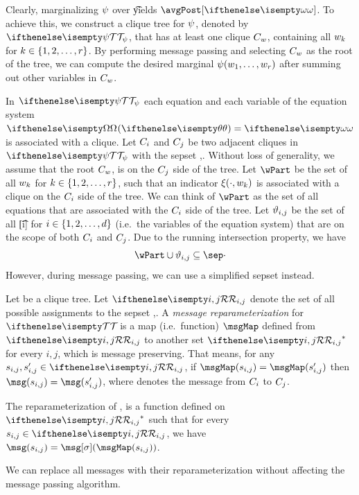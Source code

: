 Clearly, marginalizing $\psi$ over \t yields $\avgPost[\w]$.
To achieve this, we construct a clique tree for $\psi$, denoted by $\ct{\M}$, that has at least one clique $C_{w}$,
containing all
$w_k$ for $k \in \left\{ 1, 2, \ldots, r \right\}$.
By performing message passing and selecting $C_{w}$ as the root of the tree, we can compute the desired
marginal $\psi(w_1, \ldots, w_{r})$ after summing out other variables in $C_{w}$.

In $\ct{\M}$ each equation and each variable of the equation system $\eqSys$ is associated with a clique.
Let $C_{i}$ and $C_{j}$ be two adjacent cliques in $\ct{\M}$ with the sepset \sep.
Without loss of generality, we assume that the root $C_{w}$, is on the $C_{j}$ side of the tree.
Let $\wPart$ be the set of all $w_k$ for $k \in \left\{ 1, 2, \ldots, r \right\}$,
such that an indicator $\xi(\cdot, w_k)$ is associated with a clique on the $C_{i}$ side of the tree.
We can think of $\wPart$ as the set of all equations that are associated with the $C_{i}$ side of the tree.
Let $\vartheta_{i,j}$ be the set of all \t[i] for $i \in \left\{ 1, 2, \ldots, d \right\}$ (i.e.\ the variables of the equation system)
that are on the scope of both $C_{i}$ and $C_{j}$.
Due to the running intersection property, we have
\[
    \wPart \cup \eqScopeSep{i}{j} \subseteq \sep \cdot
\]
However, during message passing, we can use a simplified sepset instead.

\begin{definition}
    Let \ct{} be a clique tree.
    Let $\rangeSep$ denote the set of all possible assignments to the sepset \sep.
    A \emph{message reparameterization} for $\ct{}$ is a map (i.e.\ function) $\msgMap$ defined from $\rangeSep$
    to another set $\altRangeSep$ for every $i, j$, which is message preserving.
    That means, for any $\sepVal, \sepVal' \in \rangeSep$, if $\msgMap(\sepVal) = \msgMap(\sepVal')$
    then $\msg(\sepVal) = \msg(\sepVal')$, where \msg denotes the message from $C_{i}$ to $C_{j}$.

    The reparameterization of \msg, is a function \msg[\altMsgSym] defined on $\altRangeSep$ such that for every
    $\sepVal \in \rangeSep$, we have $\msg(\sepVal) = \msg[\altMsgSym](\msgMap(\sepVal))$.
\end{definition}

\begin{proposition}
    We can replace all messages \msg with their reparameterization \msg[\altMsgSym] without affecting the message passing
    algorithm.
\end{proposition}

